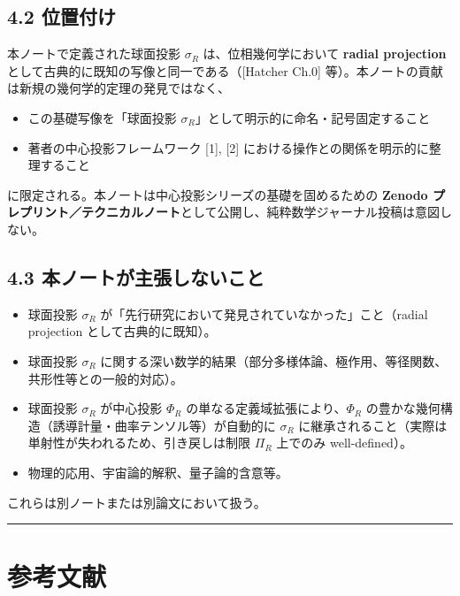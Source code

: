 \documentclass[
]{ltjsarticle}
\providecommand{\tightlist}{%
  \setlength{\itemsep}{0pt}\setlength{\parskip}{0pt}}
\begin{document}
\subsection{4.2 位置付け}\label{ux4f4dux7f6eux4ed8ux3051}

本ノートで定義された球面投影 \(\sigma_R\) は、位相幾何学において
\textbf{radial projection}
として古典的に既知の写像と同一である（{[}Hatcher Ch.0{]}
等）。本ノートの貢献は新規の幾何学的定理の発見ではなく、

\begin{itemize}
\tightlist
\item
  この基礎写像を「球面投影
  \(\sigma_R\)」として明示的に命名・記号固定すること
\item
  著者の中心投影フレームワーク {[}1{]}, {[}2{]}
  における操作との関係を明示的に整理すること
\end{itemize}

に限定される。本ノートは中心投影シリーズの基礎を固めるための
\textbf{Zenodo
プレプリント／テクニカルノート}として公開し、純粋数学ジャーナル投稿は意図しない。

\subsection{4.3
本ノートが主張しないこと}\label{ux672cux30ceux30fcux30c8ux304cux4e3bux5f35ux3057ux306aux3044ux3053ux3068}

\begin{itemize}
\tightlist
\item
  球面投影 \(\sigma_R\)
  が「先行研究において発見されていなかった」こと（radial projection
  として古典的に既知）。
\item
  球面投影 \(\sigma_R\)
  に関する深い数学的結果（部分多様体論、極作用、等径関数、共形性等との一般的対応）。
\item
  球面投影 \(\sigma_R\) が中心投影 \(\Phi_R\)
  の単なる定義域拡張により、\(\Phi_R\)
  の豊かな幾何構造（誘導計量・曲率テンソル等）が自動的に \(\sigma_R\)
  に継承されること（実際は単射性が失われるため、引き戻しは制限 \(\Pi_R\)
  上でのみ well-defined）。
\item
  物理的応用、宇宙論的解釈、量子論的含意等。
\end{itemize}

これらは別ノートまたは別論文において扱う。

\begin{center}\rule{0.5\linewidth}{0.5pt}\end{center}

\section{参考文献}\label{ux53c2ux8003ux6587ux732e}
\end{document}
